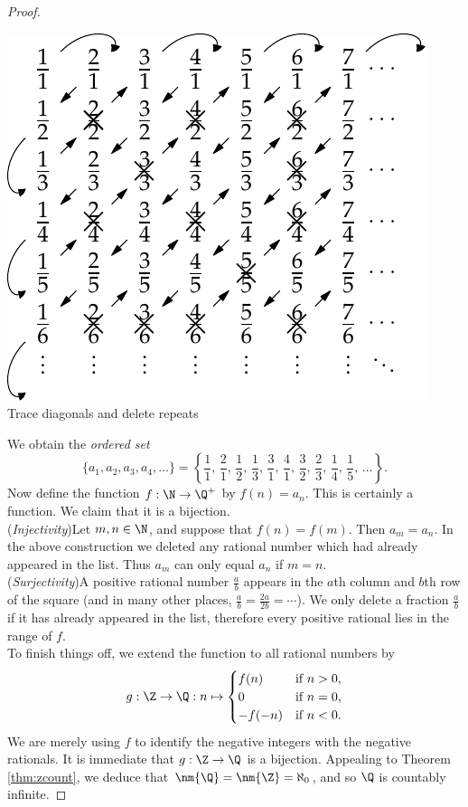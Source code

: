 \begin{proof}
\begin{center}
\begin{minipage}{0.38\textwidth}
\includegraphics[width=\textwidth]{cardinality-02-qcount}\\
Trace diagonals and delete repeats
\end{minipage}
\end{center}
We obtain the \emph{ordered set}
\[\{a_1,a_2,a_3,a_4,\ldots\}=\left\{{\frac 11,\,\frac 21,\,\frac 12,\,\frac 13,\,\frac 31,\,\frac 41,\,\frac 32,\,\frac 23,\,\frac 14,\,\frac 15,\,\ldots}\right\}.\]
Now define the function $f:\N\to\Q^+$ by $f(n)=a_n$. This is certainly a function. We claim that it is a bijection.\\[-5pt]

\noindent(\emph{Injectivity})\quad Let $m,n\in\N$, and suppose that $f(n)=f(m)$. Then $a_m=a_n$. In the above construction we deleted any rational number which had already appeared in the list. Thus $a_m$ can only equal $a_n$ if $m=n$.\\[-5pt]

\noindent(\emph{Surjectivity})\quad A positive rational number $\frac ab$ appears in the $a$th column and $b$th row of the square (and in many other places, $\frac ab=\frac{2a}{2b}=\cdots$). We only delete a fraction $\frac ab$ if it has already appeared in the list, therefore every positive rational lies in the range of $f$.\\[-5pt]

\noindent To finish things off, we extend the function to all rational numbers by
\[g:\Z\to\Q:n\mapsto\begin{cases}
f(n)&\text{if }n>0,\\
0&\text{if }n=0,\\
-f(-n)&\text{if }n<0.
\end{cases}\]
We are merely using $f$ to identify the negative integers with the negative rationals. It is immediate that $g:\Z\to\Q$ is a bijection. Appealing to Theorem \ref{thm:zcount}, we deduce that $\nm{\Q}=\nm{\Z}=\aleph_0$, and so $\Q$ is countably infinite.
\end{proof}

